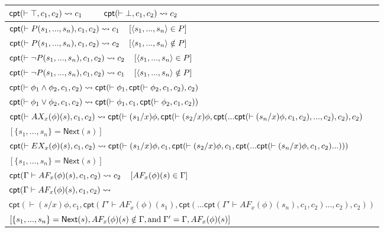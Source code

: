 \begin{figure}[t]
	\footnotesize
	\centering
	\begin{tabular}{|ll|}
		\hline
		\multicolumn{2}{|l|}{$\textsf{cpt}(\vdash\top, c_1, c_2)\rightsquigarrow c_1$ ~~~ $\textsf{cpt}(\vdash\bot, c_1, c_2)\rightsquigarrow c_2$}
		\\ \hline
		\multicolumn{2}{|l|}{$\textsf{cpt}(\vdash P(s_1,...,s_n), c_1, c_2)\rightsquigarrow c_1 ~~~ \left[\langle s_1,...,s_n\rangle\in P\right]$}
		\\ \hline
		\multicolumn{2}{|l|}{$\textsf{cpt}(\vdash P(s_1,...,s_n), c_1, c_2)\rightsquigarrow c_2 ~~~ \left[\langle s_1,...,s_n\rangle\notin P\right]$}\\\hline
		
		\multicolumn{2}{|l|}{$\textsf{cpt}(\vdash \neg P(s_1,...,s_n), c_1, c_2)\rightsquigarrow c_2 ~~~ \left[\langle s_1,...,s_n\rangle\in P\right]$}
		\\ \hline
		
		\multicolumn{2}{|l|}{$\textsf{cpt}(\vdash \neg P(s_1,...,s_n), c_1, c_2)\rightsquigarrow c_1 ~~~ \left[\langle s_1,...,s_n\rangle\notin P\right]$}\\\hline
		
		\multicolumn{2}{|l|}{$\textsf{cpt}(\vdash \phi_1\wedge\phi_2, c_1, c_2)\rightsquigarrow \textsf{cpt}(\vdash\phi_1, \textsf{cpt}(\vdash\phi_2, c_1, c_2), c_2)$}\\\hline
		
		\multicolumn{2}{|l|}{ $\textsf{cpt}(\vdash\phi_1\vee\phi_2, c_1, c_2)\rightsquigarrow \textsf{cpt}(\vdash\phi_1, c_1, \textsf{cpt}(\vdash\phi_2, c_1, c_2))$}\\ \hline
		
		\multicolumn{2}{|l|}{$\textsf{cpt}(\vdash AX_x(\phi)(s), c_1, c_2)\rightsquigarrow\textsf{cpt}(\vdash(s_1/x)\phi, \textsf{cpt}(\vdash(s_2/x)\phi, \textsf{cpt}(...\textsf{cpt}(\vdash(s_n/x)\phi, c_1, c_2),...,c_2), c_2), c_2)$}\\
		\multicolumn{2}{|l|}{$\left[\{s_1,...,s_n\}=\textsf{Next}(s)\right]$}
		\\ \hline
		
		\multicolumn{2}{|l|}{$\textsf{cpt}(\vdash EX_x(\phi)(s), c_1, c_2)\rightsquigarrow\textsf{cpt}(\vdash(s_1/x)\phi, c_1, \textsf{cpt}(\vdash(s_2/x)\phi, c_1, \textsf{cpt}(...\textsf{cpt}(\vdash(s_n/x)\phi, c_1, c_2)...)))$}\\
		\multicolumn{2}{|l|}{$\left[\{s_1,...,s_n\}=\textsf{Next}(s)\right]$}
		\\ \hline
		
		\multicolumn{2}{|l|}{$\textsf{cpt}(\Gamma\vdash AF_x(\phi)(s), c_1, c_2)\rightsquigarrow c_2 ~~~ \left[AF_x(\phi)(s)\in \Gamma\right]~~~~~~$}\\ \hline
		\multicolumn{2}{|l|}{$\textsf{cpt}(\Gamma\vdash AF_x(\phi)(s), c_1, c_2)\rightsquigarrow$}\\
		\multicolumn{2}{|l|}{$\textsf{cpt}(\vdash(s/x)\phi, c_1, \textsf{cpt}(\Gamma'\vdash AF_x(\phi)(s_1), \textsf{cpt}(...\textsf{cpt}(\Gamma'\vdash AF_x(\phi)(s_n), c_1, c_2)..., c_2), c_2))$}\\
		\multicolumn{2}{|l|}{$\left[\{s_1,...,s_n\}=\textsf{Next}(s), AF_x(\phi)(s)\notin \Gamma, \textup{and}\; \Gamma'=\Gamma,AF_x(\phi)(s)\right]$}\\ \hline
		

\end{tabular}
\end{figure}
